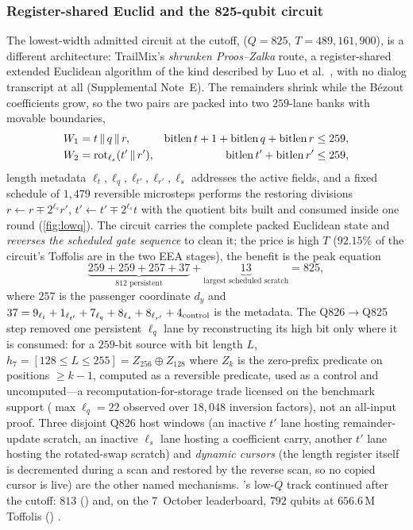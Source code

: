 \subsubsection{Register-shared Euclid and the 825-qubit circuit}\label{sec:regshare}

The lowest-width admitted circuit at the cutoff,  ($Q=825$, $T=489{,}161{,}900$), is a different architecture: TrailMix's \emph{shrunken Proos--Zalka} route, a register-shared extended Euclidean algorithm of the kind described by Luo et al.\ \cite{luo26}, with no dialog transcript at all (Supplemental Note~E). The remainders shrink while the B\'ezout coefficients grow, so the two pairs are packed into two $259$-lane banks with movable boundaries,
\[
\begin{aligned}
W_1&=t\,\Vert\,q\,\Vert\,r, & \operatorname{bitlen} t+1+\operatorname{bitlen} q+\operatorname{bitlen} r&\le259,\\
W_2&=\operatorname{rot}_{\ell_s}(t'\,\Vert\,r'), & \operatorname{bitlen} t'+\operatorname{bitlen} r'&\le259,
\end{aligned}
\]
length metadata $\ell_t,\ell_q,\ell_{t'},\ell_{r'},\ell_s$ addresses the active fields, and a fixed schedule of $1{,}479$ reversible microsteps performs the restoring divisions $r\gets r\mp2^{\ell_s}r'$, $t'\gets t'\mp2^{\ell_s}t$ with the quotient bits built and consumed inside one round (\cref{fig:lowq}). The circuit carries the complete packed Euclidean state and \emph{reverses the scheduled gate sequence} to clean it; the price is high $T$ ($92.15\%$ of the circuit's Toffolis are in the two EEA stages), the benefit is the peak equation
\begin{equation}\label{eq:peak825}
\underbrace{259+259+257+37}_{812\text{ persistent}}+\underbrace{13}_{\text{largest scheduled scratch}}=825 ,
\end{equation}
where $257$ is the passenger coordinate $d_y$ and $37=9_{\ell_t}+1_{\ell_{t'}}+7_{\ell_q}+8_{\ell_s}+8_{\ell_{r'}}+4_{\rm control}$ is the metadata. The Q826$\to$Q825 step removed one persistent $\ell_q$ lane by reconstructing its high bit only where it is consumed: for a $259$-bit source with bit length $L$, $h_7=[128\le L\le255]=Z_{256}\oplus Z_{128}$ where $Z_k$ is the zero-prefix predicate on positions $\ge k-1$, computed as a reversible predicate, used as a control and uncomputed---a recomputation-for-storage trade licensed on the benchmark support ($\max\ell_q=22$ observed over $18{,}048$ inversion factors), not an all-input proof. Three disjoint Q826 host windows (an inactive $t'$ lane hosting remainder-update scratch, an inactive $\ell_s$ lane hosting a coefficient carry, another $t'$ lane hosting the rotated-swap scratch) and \emph{dynamic cursors} (the length register itself is decremented during a scan and restored by the reverse scan, so no copied cursor is live) are the other named mechanisms. \ecdsafail{}'s low-$Q$ track continued after the cutoff: $813$ () and, on the 7~October leaderboard, $792$ qubits at $656.6$\,M Toffolis () \cite{ecdsafail-wiki}.

